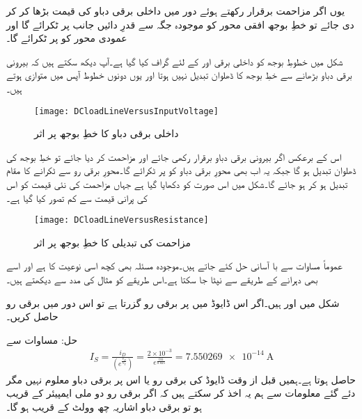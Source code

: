 یوں اگر مزاحمت برقرار رکھتے ہوئے دور میں داخلی برقی دباو  کی قیمت بڑھا کر  کر دی جائے تو خطِ بوجھ افقی محور کو موجودہ جگہ سے قدرِ دائیں جانب  پر ٹکرائے گا اور عمودی محور کو    پر ٹکرائے گا۔

شکل   میں خطوطِ بوجھ کو داخلی برقی   اور  کے لئے گراف کیا گیا ہے۔آپ دیکھ سکتے ہیں کہ بیرونی برقی دباو بڑھانے سے  خطِ بوجھ کا ڈھلوان تبدیل نہیں ہوتا اور یوں دونوں خطوط آپس میں متوازی ہوتے ہیں۔
\begin{figure}
\centering
\texttt{[image: DCloadLineVersusInputVoltage]}
\caption{داخلی برقی دباو کا خطِ بوجھ پر اثر}
\label{شکل_داخلی_برقی_دباو_کا_بار_کے_خط_پر_اثر}
\end{figure}
اس کے برعکس اگر بیرونی برقی دباو  برقرار رکھی جائے اور مزاحمت  کر دیا جائے تو خطِ بوجھ کی ڈھلوان تبدیل ہو گا جبکہ یہ اب بھی محورِ برقی دباو کو  پر ٹکرائے گا۔محورِ برقی رو سے ٹکرانے کا مقام تبدیل ہو کر  ہو جائے گا۔شکل   میں اس صورت کو دکھایا گیا ہے جہاں مزاحمت کی نئی قیمت  کو اس کی پرانی قیمت  سے کم تصور کیا گیا ہے۔
\begin{figure}
\centering
\texttt{[image: DCloadLineVersusResistance]}
\caption{مزاحمت کی تبدیلی کا خطِ بوجھ پر اثر}
\label{شکل_مزاحمت_کا_بار_کے_خط_پر_اثرات}
\end{figure}
عموماً مساوات   سے با آسانی حل کئے جاتے ہیں۔موجودہ مسئلہ بھی کچھ اسی نوعیت کا ہے اور اسے بھی دہرانے کے طریقے سے نپٹا جا سکتا ہے۔اس طریقے کو مثال کی مدد سے دیکھتے ہیں۔

شکل   میں  اور  ہیں۔اگر اس ڈایوڈ
 میں  پر  برقی رو گزرتا ہے تو اس دور میں برقی رو حاصل کریں۔ 

حل:	مساوات   سے
\begin{align*}
I_S = \frac{i_D}{\left( e^{\frac{v_D}{V_T}} \right )}=\frac{2 \times 10^{-3}}{e^{\frac{0.6}{0.025}}}=\SI{7.550269e-14}{\ampere}
\end{align*}
حاصل ہوتا ہے۔ہمیں قبل از وقت ڈایوڈ کی برقی رو یا اس پر برقی دباو معلوم نہیں مگر دئے گئے معلومات سے ہم یہ اخذ کر سکتے ہیں کہ اگر برقی رو دو ملی ایمپیئر کے قریب ہو تو برقی دباو اشاریہ چھ وولٹ کے قریب ہو گا۔

